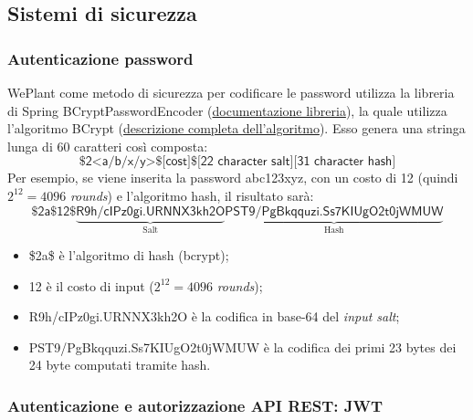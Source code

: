 \documentclass[a4paper]{article}
\begin{document}
	\subsection{Sistemi di sicurezza}
	
	\subsubsection{Autenticazione password}
	
	WePlant come metodo di sicurezza per codificare le password utilizza la libreria di Spring \textsf{BCryptPasswordEncoder} (\href{https://docs.spring.io/spring-security/site/docs/current/api/org/springframework/security/crypto/bcrypt/BCryptPasswordEncoder.html}{documentazione libreria}), la quale utilizza l'algoritmo BCrypt (\href{https://en.wikipedia.org/wiki/Bcrypt#Description}{descrizione completa dell'algoritmo}). Esso genera una stringa lunga di 60 caratteri così composta:
	\begin{equation*}
		\$\textsf{2<a/b/x/y>}\$\textsf{[cost]}\$\textsf{[22 character salt][31 character hash]}
	\end{equation*}
	Per esempio, se viene inserita la password \textsf{abc123xyz}, con un costo di 12 (quindi $2^{12} = 4096$ \emph{rounds}) e l'algoritmo hash, il risultato sarà:
	\begin{equation*}
		\$
		\textsf{2a}
		\$
		\textsf{12}
		\$
		\underbrace{\textsf{R9h/cIPz0gi.URNNX3kh2O}}_{\text{Salt}}
		\underbrace{\textsf{PST9/PgBkqquzi.Ss7KIUgO2t0jWMUW}}_{\text{Hash}}
	\end{equation*}
	\begin{itemize}
		\item \textsf{\$2a\$} è l'algoritmo di hash (bcrypt);
		
		\item \textsf{12} è il costo di input ($2^{12} = 4096$ \emph{rounds});
		
		\item \textsf{R9h/cIPz0gi.URNNX3kh2O} è la codifica in base-64 del \emph{input salt};
		
		\item \textsf{PST9/PgBkqquzi.Ss7KIUgO2t0jWMUW} è la codifica dei primi 23 bytes dei 24 byte computati tramite hash.
	\end{itemize}\newpage
	
	\subsubsection{Autenticazione e autorizzazione API REST: JWT}
	
\end{document}
